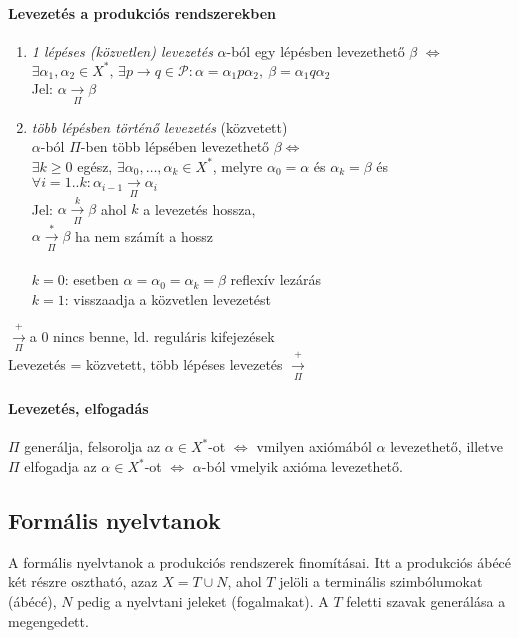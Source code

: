\documentclass[fleqn,10pt,a4paper]{article}
\newcommand{\listazjbetu}{
  \renewcommand{\theenumi}{\alph{enumi}}
  \renewcommand{\labelenumi}{(\theenumi)}
}
\newenvironment{enumzjbetu}{\listazjbetu\begin{enumerate}}{\end{enumerate}}
\newenvironment{enumzjb}{\begin{enumzjbetu}}{\end{enumzjbetu}}
\theoremstyle{magyar}
\begin{document}
  \paragraph{Levezetés a produkciós rendszerekben}
  \begin{enumzjb}
  \item \emph{1 lépéses (közvetlen) levezetés} $\alpha$-ból egy lépésben levezethető $\beta$ $\iff$\\ $\exists
    \alpha_1,\alpha_2\in X^*,\,\exists p\to q\in \mathcal P: \alpha = \alpha_1 p\alpha_2,\ \beta = \alpha_1 q \alpha_2$\\
    Jel: $\alpha \xrightarrow[\Pi]{} \beta$
  \item \emph{több lépésben történő levezetés} (közvetett)\\
    $\alpha$-ból $\Pi$-ben több lépsében levezethető $\beta \iff$\\
    $\exists k\geq0$ egész, $\exists \alpha_0,\ldots,\alpha_k\in X^*$, melyre $\alpha_0=\alpha$ és $\alpha_k = \beta$ és
    $\forall i=1..k: \alpha_{i-1}\xrightarrow[\Pi]{}\alpha_i$\\
    Jel: $\alpha\xrightarrow[\Pi]{k}\beta$ ahol $k$ a levezetés hossza,\\
    \hspace{1cm}$\alpha \xrightarrow[\Pi]{*} \beta$ ha nem számít a hossz\\\\
    $k=0$: esetben $\alpha=\alpha_0=\alpha_k=\beta$ reflexív lezárás\\
    $k=1$: visszaadja a közvetlen levezetést
  \end{enumzjb}
  $\xrightarrow[\Pi]{+}$\quad a $0$ nincs benne, ld. reguláris kifejezések\\
  Levezetés = közvetett, több lépéses levezetés
  $\xrightarrow[\Pi]{+}$
  
  \paragraph{Levezetés, elfogadás} $\Pi$ generálja, felsorolja az $\alpha\in X^*$-ot $\iff$ vmilyen axiómából $\alpha$
  levezethető, illetve $\Pi$ elfogadja az $\alpha\in X^*$-ot $\iff$  $\alpha$-ból vmelyik axióma levezethető. 
  
  \subsection{Formális nyelvtanok}
  A formális nyelvtanok a produkciós rendszerek finomításai. Itt a produkciós ábécé két részre osztható, azaz $X  = T
  \cup N$, ahol $T$ jelöli a terminális szimbólumokat (ábécé), $N$ pedig a nyelvtani jeleket (fogalmakat). A $T$ feletti
  szavak generálása a megengedett.
\end{document}
